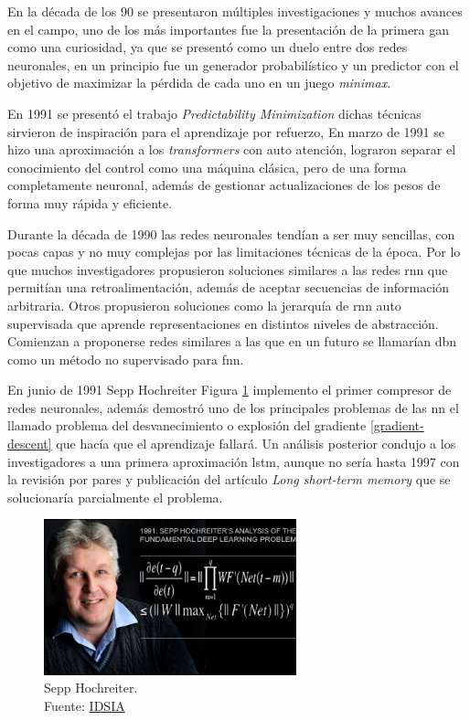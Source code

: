 En la década de los 90 se presentaron múltiples investigaciones y muchos avances en el campo, uno de los más importantes fue la presentación de la primera \acrshort{gan} como una curiosidad, ya que se presentó como un duelo entre dos redes neuronales, en un principio fue un generador probabilístico y un predictor con el objetivo de maximizar la pérdida de cada uno en un juego \textit{minimax}.

En 1991 se presentó el trabajo \textit{Predictability Minimization} \cite{urgen1991learning} dichas técnicas sirvieron de inspiración para el aprendizaje por refuerzo,
En marzo de 1991 se hizo una aproximación a los \textit{transformers} con auto atención, lograron separar el conocimiento del control como una máquina clásica, pero de una forma completamente neuronal, además de gestionar actualizaciones de los pesos de forma muy rápida y eficiente.

Durante la década de 1990 las redes neuronales tendían a ser muy sencillas, con pocas capas y no muy complejas por las limitaciones técnicas de la época.
Por lo que muchos investigadores propusieron soluciones similares a las redes \acrshort{rnn} que permitían una retroalimentación, además de aceptar secuencias de información arbitraria.
Otros propusieron soluciones como la jerarquía de \acrshort{rnn} auto supervisada que aprende representaciones en distintos niveles de abstracción.
Comienzan a proponerse redes similares a las que en un futuro se llamarían \acrshort{dbn} como un método no supervisado para \acrshort{fnn}.

En junio de 1991 {Sepp Hochreiter} Figura \ref{fig:sepp-hochreiter} implemento el primer compresor de redes neuronales, además demostró uno de los principales problemas de las \acrshort{nn} el llamado problema del desvanecimiento o explosión del gradiente \ref{gradient-descent} que hacía que el aprendizaje fallará.
Un análisis posterior condujo a los investigadores a una primera aproximación \acrshort{lstm}, aunque no sería hasta 1997 con la revisión por pares y publicación del artículo \textit{Long short-term memory} \cite{hochreiter1997long} que se solucionaría parcialmente el problema.

\begin{figure}[H]
    \centering
    \includegraphics[width=0.65\textwidth]{figures/Sepp Hochreiter.jpg}
    \caption{Sepp Hochreiter.\\Fuente: \href{https://people.idsia.ch/~juergen/fundamentaldeeplearningproblem.html}{IDSIA}}
    \label{fig:sepp-hochreiter}
\end{figure}

